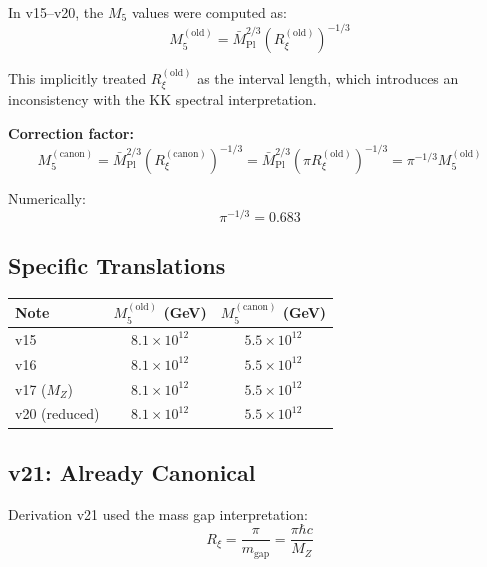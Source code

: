 \documentclass[11pt,a4paper]{article}
\newcommand{\Rxi}{R_\xi}
\newcommand{\Mplbar}{\bar{M}_{\mathrm{Pl}}}
\newcommand{\Mfive}{M_5}
\newcommand{\MZ}{M_Z}
\newcommand{\mgap}{m_{\mathrm{gap}}}
\begin{document}
In v15--v20, the $\Mfive$ values were computed as:
\begin{equation}
\Mfive^{\mathrm{(old)}} = \Mplbar^{2/3} (\Rxi^{\mathrm{(old)}})^{-1/3}
\label{eq:M5-old-formula}
\end{equation}

This implicitly treated $\Rxi^{\mathrm{(old)}}$ as the interval length, which
introduces an inconsistency with the KK spectral interpretation.

\textbf{Correction factor:}
\begin{equation}
\Mfive^{\mathrm{(canon)}} = \Mplbar^{2/3} (\Rxi^{\mathrm{(canon)}})^{-1/3}
= \Mplbar^{2/3} (\pi \Rxi^{\mathrm{(old)}})^{-1/3} = \pi^{-1/3} \Mfive^{\mathrm{(old)}}
\label{eq:M5-correction}
\end{equation}

Numerically:
\begin{equation}
\pi^{-1/3} = 0.683
\label{eq:pi-minus-third}
\end{equation}

\subsection{Specific Translations}

\begin{center}
\begin{tabular}{lcc}
\toprule
\textbf{Note} & \textbf{$\Mfive^{\mathrm{(old)}}$ (GeV)} & \textbf{$\Mfive^{\mathrm{(canon)}}$ (GeV)} \\
\midrule
v15 & $8.1 \times 10^{12}$ & $5.5 \times 10^{12}$ \\
v16 & $8.1 \times 10^{12}$ & $5.5 \times 10^{12}$ \\
v17 ($M_Z$) & $8.1 \times 10^{12}$ & $5.5 \times 10^{12}$ \\
v20 (reduced) & $8.1 \times 10^{12}$ & $5.5 \times 10^{12}$ \\
\bottomrule
\end{tabular}
\end{center}

\subsection{v21: Already Canonical}

Derivation v21 used the mass gap interpretation:
\begin{equation}
\Rxi = \frac{\pi}{\mgap} = \frac{\pi\hbar c}{\MZ}
\label{eq:v21-Rxi}
\end{equation}
\end{document}
